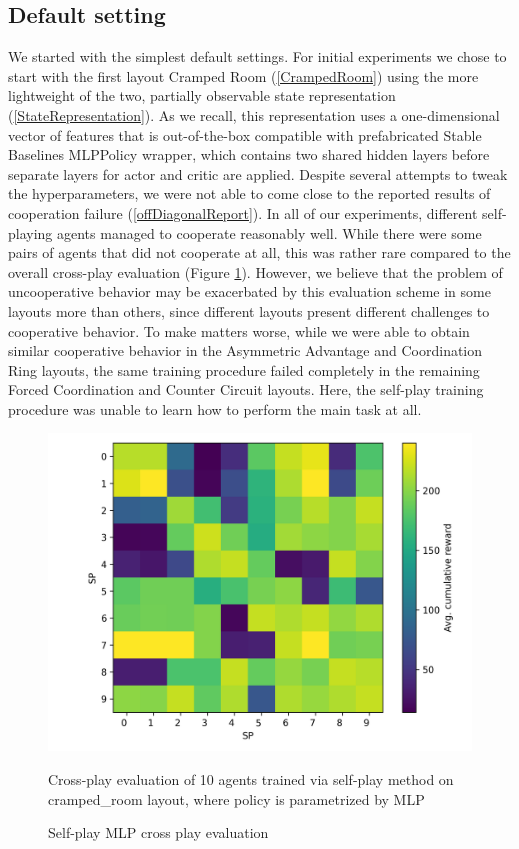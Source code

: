\subsection*{Default setting}
We started with the simplest default settings.
For initial experiments we chose to start with the first layout Cramped Room (\ref{CrampedRoom}) using the more lightweight of the two, partially observable state representation (\ref{StateRepresentation}).
As we recall, this representation uses a one-dimensional vector of features that is out-of-the-box compatible with prefabricated Stable Baselines MLPPolicy wrapper, which contains two shared hidden layers before separate layers for actor and critic are applied.
Despite several attempts to tweak the hyperparameters, we were not able to come close to the reported results of cooperation failure (\ref{offDiagonalReport}).
In all of our experiments, different self-playing agents managed to cooperate reasonably well.
While there were some pairs of agents that did not cooperate at all, this was rather rare compared to the overall cross-play evaluation (Figure \ref{MLPSPCrossPlay}).
However, we believe that the problem of uncooperative behavior may be exacerbated by this evaluation scheme in some layouts more than others, since different layouts present different challenges to cooperative behavior.
To make matters worse, while we were able to obtain similar cooperative behavior in the Asymmetric Advantage and Coordination Ring layouts, the same training procedure failed completely in the remaining Forced Coordination and Counter Circuit layouts.
Here, the self-play training procedure was unable to learn how to perform the main task at all.

\begin{figure}[!ht]
    \centering
    \includegraphics*[width=13cm]{../img/MLP_OFF_DIAG_TEST(3).png}
    \caption{Self-play MLP cross play evaluation}
    \label{MLPSPCrossPlay}
    \medskip
    \small 
    Cross-play evaluation of 10 agents trained via self-play method on cramped\_room layout, where policy is parametrized by MLP

\end{figure}

